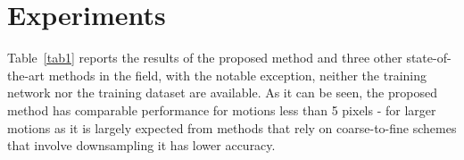 \documentclass[10pt,twocolumn,letterpaper]{article}
\begin{document}
\section{Experiments}

Table~\ref{tab1} reports the results of the proposed method and three other state-of-the-art methods in the field, with the notable exception, neither the training network nor the training dataset are available. As it can be seen, the proposed method has comparable performance for motions less than 5 pixels - for larger motions as it is largely expected from methods that rely on coarse-to-fine schemes that involve downsampling it has lower accuracy.
{\small


}
\end{document}
